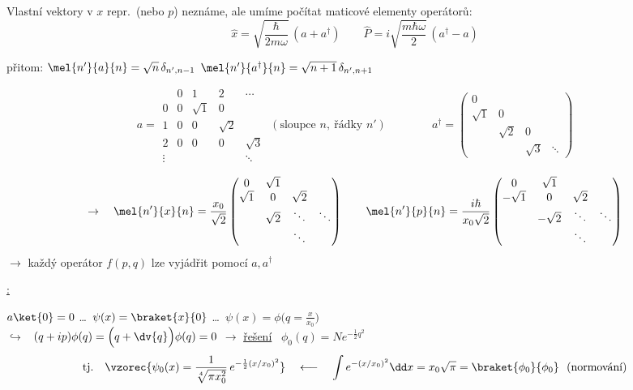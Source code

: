 Vlastní vektory v $x$ repr.\ (nebo $p$) neznáme, ale umíme počítat maticové elementy operátorů:
\[
  \hat x = \sqrt{\frac{\hbar}{2m\omega}}\,(a + a^\dagger) \qquad
  \hat P = i\sqrt{\frac{m\hbar\omega}{2}}\,(a^\dagger - a)
\]

přitom: \quad $\mel{n'}{a}{n} = \sqrt n\,\delta_{n',n-1}$ \hfill $\mel{n'}{a^\dagger}{n} = \sqrt{n+1}\,\delta_{n',n+1}$

{\color{gray}
\[
  a = \begin{array}{c|cccc}
       & 0 & 1 & 2 & \cdots \\ \hline
     0 & 0 & \sqrt1 & 0 & \\
     1 & 0 & 0 & \sqrt2 & \\
     2 & 0 & 0 & 0 & \sqrt3 \\
     \vdots & & & & \ddots
  \end{array}
  \ (\text{sloupce } n,\ \text{řádky } n')
  \qquad\qquad
  a^\dagger = \begin{pmatrix}
     0 & & & \\
     \sqrt1 & 0 & & \\
     & \sqrt2 & 0 & \\
     & & \sqrt3 & \ddots
  \end{pmatrix}
\]}

\[
  \to\quad \mel{n'}{x}{n} = \frac{x_0}{\sqrt2}\begin{pmatrix} 0 & \sqrt1 & & \\ \sqrt1 & 0 & \sqrt2 & \\ & \sqrt2 & \ddots & \ddots \\ & & \ddots & \end{pmatrix}
  \qquad
  \mel{n'}{p}{n} = \frac{i\hbar}{x_0\sqrt2}\begin{pmatrix} 0 & \sqrt1 & & \\ -\sqrt1 & 0 & \sqrt2 & \\ & -\sqrt2 & \ddots & \ddots \\ & & \ddots & \end{pmatrix}
\]
$\to$ každý operátor $f(p,q)$ lze vyjádřit pomocí $a, a^\dagger$

\underline{:}

$a\ket{0} = 0$ \quad \dots\ $\psi(x) = \braket{x}{0}$ \quad \dots\ $\psi(x) = \phi\big(q = \frac{x}{x_0}\big)$ \\
\quad $\hookrightarrow$ \ $(q + ip)\phi(q) = \Big(q + \dv{q}\Big)\phi(q) = 0$ \quad $\to$ \underline{řešení} \ $\phi_0(q) = Ne^{-\frac12q^2}$
\[
  \text{tj.}\quad \vzorec{\psi_0(x) = \frac{1}{\sqrt[4]{\pi x_0^2}}\,e^{-\frac12(x/x_0)^2}}
  \quad\longleftarrow\quad \int e^{-(x/x_0)^2}\dd x = x_0\sqrt\pi = \braket{\phi_0}{\phi_0} \ \ \text{(normování)}
\]

